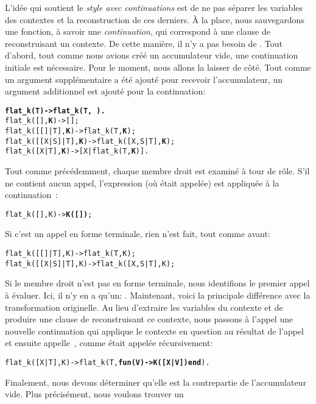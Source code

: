 L'idée qui soutient le \emph{style avec continuations} est de ne pas séparer les variables des contextes
et la reconstruction de ces derniers. À la place, nous sauvegardons
une fonction, à savoir une \emph{continuation}, qui correspond à une
clause de  reconstruisant un contexte. De cette
manière, il n'y a pas besoin de . Tout d'abord, tout
comme nous avions créé un accumulateur vide, une continuation initiale
est nécessaire. Pour le moment, nous allons la laisser de côté. Tout
comme un argument supplémentaire a été ajouté pour recevoir
l'accumulateur, un argument additionnel est ajouté pour la
continuation:
\begin{alltt}
\textbf{flat\_k(T)           -> flat\_k(T,\,).}
flat\_k(       [],\textbf{K}) -> [];\hfill% K \emph{inutile pour le moment}
flat\_k(   [[]|T],\textbf{K}) -> flat\_k(T,\textbf{K});
flat\_k([[X|S]|T],\textbf{K}) -> flat\_k([X,S|T],\textbf{K});
flat\_k(    [X|T],\textbf{K}) -> [X|flat\_k(T,\textbf{K})].
\end{alltt}
Tout comme précédemment, chaque membre droit est examiné à tour de
rôle. S'il ne contient aucun appel, l'expression (où 
était appelée) est appliquée à la continuation~:
\begin{alltt}
flat\_k(       [],K) -> \textbf{K([])};
\end{alltt}
Si c'est un appel en forme terminale, rien n'est fait, tout comme
avant:
\begin{alltt}
flat\_k(   [[]|T],K) -> flat\_k(T,K);
flat\_k([[X|S]|T],K) -> flat\_k([X,S|T],K);
\end{alltt}
Si le membre droit n'est pas en forme terminale, nous identifions le
premier appel à évaluer. Ici, il n'y en a qu'un:
. Maintenant, voici la principale différence
avec la transformation originelle. Au lieu d'extraire les variables du
contexte et de produire une clause de  reconstruisant
ce contexte, nous passons à l'appel une nouvelle continuation qui
applique le contexte en question au résultat de l'appel et ensuite
appelle~, comme  était appelée
récursivement:
\begin{alltt}
flat\_k(    [X|T],K) -> flat\_k(T,\textbf{fun(V) -> K([X|V]) end}).
\end{alltt}
Finalement, nous devons déterminer qu'elle est la contrepartie de
l'accumulateur vide. Plus précisément, nous voulons trouver un
